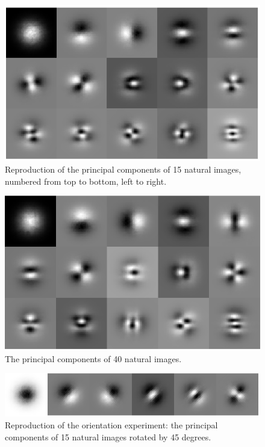 \begin{figure}
    \centering
    \includegraphics[scale=0.55]{figures/Figure2.png}
    \caption{Reproduction of the principal components of 15 natural images, numbered from top to bottom, left to right.}
    \label{fig:Figure2}
\end{figure}
\begin{figure}
    \centering
    \includegraphics[scale=0.55]{figures/Figure3.png}
    \caption{The principal components of 40 natural images.}
    \label{fig:Figure3}
\end{figure}
\begin{figure}
    \centering
    \includegraphics[scale=0.55]{figures/Figure4.png}
    \caption{Reproduction of the orientation experiment: the principal components of 15 natural images rotated by 45 degrees.}
    \label{fig:Figure4}
\end{figure}

